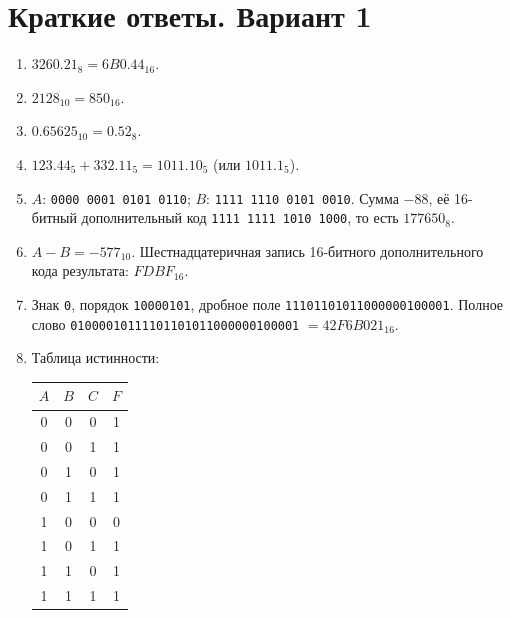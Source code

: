 \section*{Краткие ответы. Вариант 1}

\begin{enumerate}
    \item $3260.21_8=6B0.44_{16}$.

    \item $2128_{10}=850_{16}$.

    \item $0.65625_{10}=0.52_8$.

    \item $123.44_5+332.11_5=1011.10_5$ (или $1011.1_5$).

    \item $A$: \texttt{0000 0001 0101 0110}; $B$: \texttt{1111 1110 0101 0010}. Сумма $-88$, её 16-битный дополнительный код \texttt{1111 1111 1010 1000}, то есть $177650_8$.

    \item $A-B=-577_{10}$. Шестнадцатеричная запись 16-битного дополнительного кода результата: $FDBF_{16}$.

    \item Знак \texttt{0}, порядок \texttt{10000101}, дробное поле \texttt{11101101011000000100001}. Полное слово \texttt{01000010111101101011000000100001} $=42F6B021_{16}$.

    \item Таблица истинности:
    \begin{center}
    \begin{tabular}{ccc|c}
    $A$ & $B$ & $C$ & $F$\\\hline
    0 & 0 & 0 & 1\\
    0 & 0 & 1 & 1\\
    0 & 1 & 0 & 1\\
    0 & 1 & 1 & 1\\
    1 & 0 & 0 & 0\\
    1 & 0 & 1 & 1\\
    1 & 1 & 0 & 1\\
    1 & 1 & 1 & 1
    \end{tabular}
    \end{center}
\end{enumerate}
